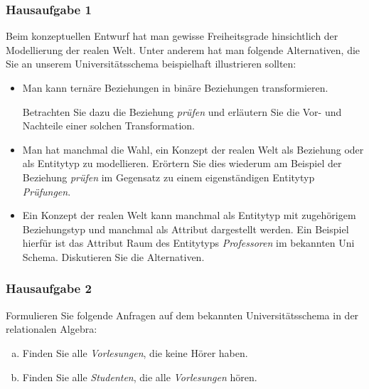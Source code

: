 \begin{frame}
	\frametitle{Hausaufgabe 1}
	\vspace{0.25cm}

	Beim konzeptuellen Entwurf hat man gewisse Freiheitsgrade hinsichtlich der Modellierung der realen Welt.
	Unter anderem hat man folgende Alternativen, die Sie an unserem Universitätsschema beispielhaft illustrieren sollten:

	\begin{itemize}
		\item Man kann ternäre Beziehungen in binäre Beziehungen transformieren.

		      Betrachten Sie dazu die Beziehung \textit{prüfen} und erläutern Sie die Vor- und Nachteile
		      einer solchen Transformation.
		\item Man hat manchmal die Wahl, ein Konzept der realen Welt als Beziehung
		      oder als Entitytyp zu modellieren. Erörtern Sie dies wiederum am Beispiel
		      der Beziehung \textit{prüfen} im Gegensatz zu einem eigenständigen Entitytyp \textit{Prüfungen}.
		\item Ein Konzept der realen Welt kann manchmal als Entitytyp mit zugehörigem
		      Beziehungstyp und manchmal als Attribut dargestellt werden.
		      Ein Beispiel hierfür ist das Attribut Raum des Entitytyps
		      \textit{Professoren} im bekannten Uni Schema. Diskutieren Sie die Alternativen.
	\end{itemize}
\end{frame}

\begin{frame}
	\frametitle{Hausaufgabe 2}
	\vspace{0.25cm}

	Formulieren Sie folgende Anfragen auf dem bekannten Universitätsschema in der relationalen Algebra:
	\begin{enumerate}[a)]
		\item Finden Sie alle \textit{Vorlesungen}, die keine Hörer haben.
		\item Finden Sie alle \textit{Studenten}, die alle \textit{Vorlesungen} hören.
	\end{enumerate}
\end{frame}

